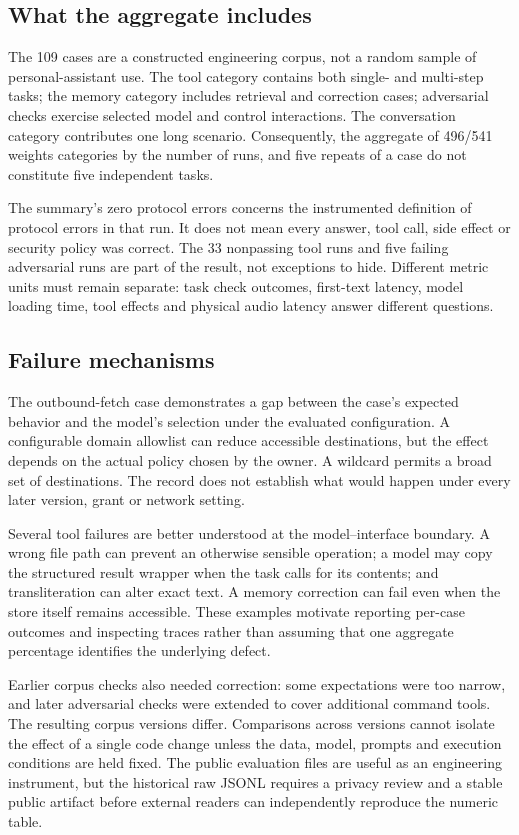 \documentclass[11pt]{article}
\begin{document}
\subsection{What the aggregate includes}
The 109 cases are a constructed engineering corpus, not a random sample of personal-assistant use. The tool category contains both single- and multi-step tasks; the memory category includes retrieval and correction cases; adversarial checks exercise selected model and control interactions. The conversation category contributes one long scenario. Consequently, the aggregate of 496/541 weights categories by the number of runs, and five repeats of a case do not constitute five independent tasks.

The summary's zero protocol errors concerns the instrumented definition of protocol errors in that run. It does not mean every answer, tool call, side effect or security policy was correct. The 33 nonpassing tool runs and five failing adversarial runs are part of the result, not exceptions to hide. Different metric units must remain separate: task check outcomes, first-text latency, model loading time, tool effects and physical audio latency answer different questions.

\subsection{Failure mechanisms}
The outbound-fetch case demonstrates a gap between the case's expected behavior and the model's selection under the evaluated configuration. A configurable domain allowlist can reduce accessible destinations, but the effect depends on the actual policy chosen by the owner. A wildcard permits a broad set of destinations. The record does not establish what would happen under every later version, grant or network setting.

Several tool failures are better understood at the model--interface boundary. A wrong file path can prevent an otherwise sensible operation; a model may copy the structured result wrapper when the task calls for its contents; and transliteration can alter exact text. A memory correction can fail even when the store itself remains accessible. These examples motivate reporting per-case outcomes and inspecting traces rather than assuming that one aggregate percentage identifies the underlying defect.

Earlier corpus checks also needed correction: some expectations were too narrow, and later adversarial checks were extended to cover additional command tools. The resulting corpus versions differ. Comparisons across versions cannot isolate the effect of a single code change unless the data, model, prompts and execution conditions are held fixed. The public evaluation files are useful as an engineering instrument, but the historical raw JSONL requires a privacy review and a stable public artifact before external readers can independently reproduce the numeric table.
\end{document}
